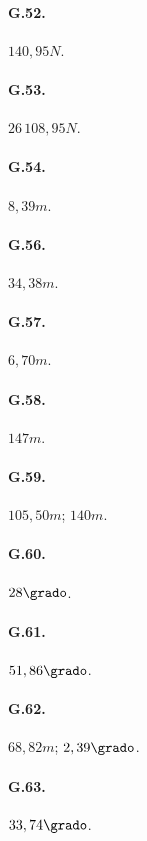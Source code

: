 \begin{multicols}{3}
\paragraph{G.52.}$140,95\unit{N}$.

\paragraph{G.53.}$26\,108,95\unit{N}$.

\paragraph{G.54.}$8,39\unit{m}$.

\paragraph{G.56.}$34,38\unit{m}$.

\paragraph{G.57.}$6,70\unit{m}$.

\paragraph{G.58.}$147\unit{m}$.

\paragraph{G.59.}$105,50\unit{m}$; $140\unit{m}$.

\paragraph{G.60.}$28\grado$.

\paragraph{G.61.}$51,86\grado$.

\paragraph{G.62.}$68,82\unit{m}$; $2,39\grado$.

\paragraph{G.63.}$33,74\grado$.


\end{multicols}
